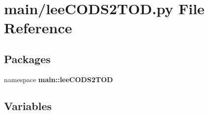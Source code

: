 \section{main/lee\-C\-O\-D\-S2\-T\-O\-D.py \-File \-Reference}
\label{lee_c_o_d_s2_t_o_d_8py}
\subsection*{\-Packages}
\begin{DoxyCompactItemize}
\item 
namespace {\bf main\-::lee\-C\-O\-D\-S2\-T\-O\-D}
\end{DoxyCompactItemize}
\subsection*{\-Variables}
